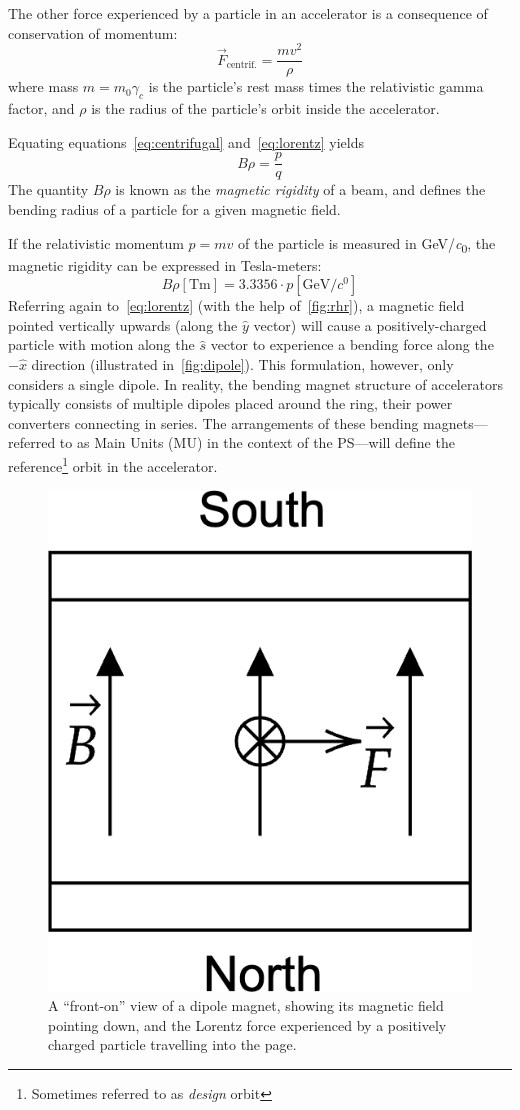 \documentclass[a4paper,twoside,11pt]{report}
\begin{document}
The other force experienced by a particle in an accelerator is a consequence of conservation of momentum:
\begin{equation}
\vec F_{\text{centrif.}}=\frac{mv^2}{\rho}\label{eq:centrifugal}
\end{equation} where mass $m = m_0\gamma_c$ is the particle's rest mass times the relativistic gamma factor, and $\rho$ is the radius of the particle's orbit inside the accelerator.

Equating equations~\ref{eq:centrifugal} and~\ref{eq:lorentz} yields
\begin{equation}
B\rho=\frac pq
\label{eq:brho}
\end{equation}
The quantity $B\rho$ is known as the \textit{magnetic rigidity} of a beam, and defines the bending radius of a particle for a given magnetic field. 

If the relativistic momentum $p=mv$ of the particle is measured in \unit[per-mode = symbol]{\GeV\per\clight}, the magnetic rigidity can be expressed in Tesla-meters:
\begin{equation}
B\rho \left[\unit{\tesla\meter}\right] = 3.3356\cdot p\left[\unit{\giga\electronvolt\per\clight}\right]
\label{tesla-meters}
\end{equation} %
Referring again to~\autoref{eq:lorentz} (with the help of~\autoref{fig:rhr}), a magnetic field pointed vertically upwards (along the $\hat y$ vector) will cause a positively-charged particle with motion along the $\hat s$ vector to experience a bending force along the $-\hat x$ direction (illustrated in~\autoref{fig:dipole}). This formulation, however, only considers a single dipole. In reality, the bending magnet structure of accelerators typically consists of multiple dipoles placed around the ring, their power converters connecting in series. The arrangements of these bending magnets---referred to as Main Units (MU) in the context of the PS---will define the reference\footnote{Sometimes referred to as \textit{design} orbit} orbit in the accelerator.

\begin{figure}[h]
  \centering
  \includegraphics*[width=0.2\linewidth]{dipole-bending.png}
  \caption[Illustration of the force experienced by a charged particle in a magnetic dipole field.]{A ``front-on'' view of a dipole magnet, showing its magnetic field pointing down, and the Lorentz force experienced by a positively charged particle travelling into the page.}\label{fig:dipole}
\end{figure}
\end{document}
